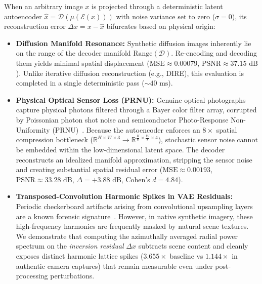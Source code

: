 \documentclass[11pt]{article}
\theoremstyle{definition}
\begin{document}
When an arbitrary image $x$ is projected through a deterministic latent autoencoder $\hat{x} = \mathcal{D}(\mu(\mathcal{E}(x)))$ with noise variance set to zero ($\sigma = 0$), its reconstruction error $\Delta x = x - \hat{x}$ bifurcates based on physical origin:
\begin{itemize}
    \item \textbf{Diffusion Manifold Resonance:} Synthetic diffusion images inherently lie on the range of the decoder manifold $\text{Range}(\mathcal{D})$. Re-encoding and decoding them yields minimal spatial displacement ($\text{MSE} \approx 0.00079$, $\text{PSNR} \approx 37.15\text{ dB}$). Unlike iterative diffusion reconstruction (e.g., DIRE), this evaluation is completed in a single deterministic pass ($\sim 40\text{ ms}$).
    \item \textbf{Physical Optical Sensor Loss (PRNU):} Genuine optical photographs capture physical photons filtered through a Bayer color filter array, corrupted by Poissonian photon shot noise and semiconductor Photo-Response Non-Uniformity (PRNU)~\citep{fridrich2009digital,lukas2006digital}. Because the autoencoder enforces an $8\times$ spatial compression bottleneck ($\mathbb{R}^{H \times W \times 3} \to \mathbb{R}^{\frac{H}{8} \times \frac{W}{8} \times 4}$), stochastic sensor noise cannot be embedded within the low-dimensional latent space. The decoder reconstructs an idealized manifold approximation, stripping the sensor noise and creating substantial spatial residual error ($\text{MSE} \approx 0.00193$, $\text{PSNR} \approx 33.28\text{ dB}$, $\Delta = +3.88\text{ dB}$, Cohen's $d = 4.84$).
    \item \textbf{Transposed-Convolution Harmonic Spikes in VAE Residuals:} Periodic checkerboard artifacts arising from convolutional upsampling layers are a known forensic signature~\citep{wang2020cnn,durall2020watch,frank2020leveraging,corvi2023detection}. However, in native synthetic imagery, these high-frequency harmonics are frequently masked by natural scene textures. We demonstrate that computing the azimuthally averaged radial power spectrum on the \textit{inversion residual} $\Delta x$ subtracts scene content and cleanly exposes distinct harmonic lattice spikes ($3.655\times$ baseline vs $1.144\times$ in authentic camera captures) that remain measurable even under post-processing perturbations.
\end{itemize}
\end{document}
